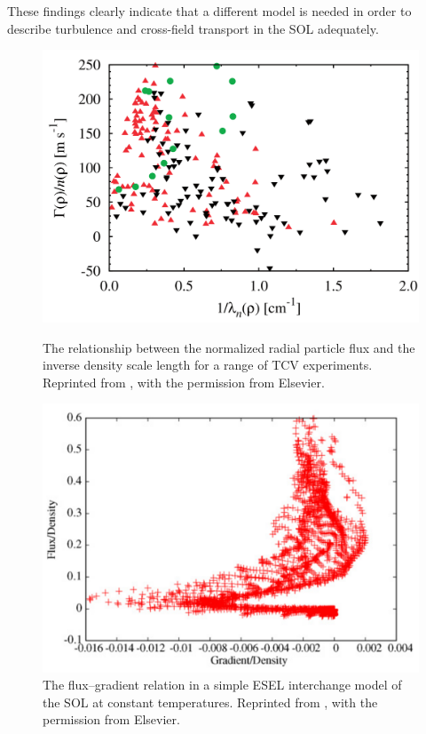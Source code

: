 These findings clearly indicate that a different model is needed in order to describe turbulence and cross-field transport in the SOL adequately. 
\begin{figure}
	\centering
	\begin{minipage}{.48\linewidth}
			\includegraphics[width=\linewidth]{figures/garcia_flux.png}
	\caption{The relationship between the normalized radial particle flux and the inverse density scale length for a range of TCV experiments. Reprinted from \cite{garcia2007turbulent}, with the permission from Elsevier.}
		\label{Fig:garcia_flux}
	\end{minipage}
	\hfill
	\begin{minipage}{.48\linewidth}
		\includegraphics[width=\linewidth]{figures/naulin.png}
	\caption{The ﬂux–gradient relation in a simple ESEL interchange model of the SOL at constant temperatures. Reprinted from \cite{naulin2007turbulent}, with the permission from Elsevier.}
		\label{Fig:naulin}
	\end{minipage}
\end{figure}


